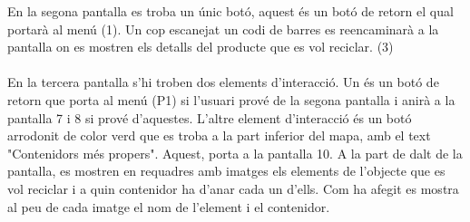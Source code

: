 \documentclass{article}
\begin{document}
En la segona pantalla es troba un únic botó, aquest
és un botó de retorn el qual portarà
al menú (1). Un cop escanejat un codi de barres es reencaminarà
a la pantalla on es mostren els detalls del producte que es vol reciclar. (3)
\\\\
En la tercera pantalla s'hi troben dos elements d'interacció.
Un és un botó de retorn que porta al menú (P1)
si l'usuari prové de la segona pantalla i anirà a
la pantalla 7 i 8 si prové d'aquestes. L'altre
element d'interacció és un botó arrodonit de color
verd que es troba a la part inferior del mapa, amb el text
"Contenidors més propers". Aquest, porta a la pantalla 10.
A la part de dalt de la pantalla, es mostren
en requadres amb imatges els elements de l'objecte
que es vol reciclar i a quin contenidor ha d'anar cada un d'ells.
Com ha afegit es mostra al peu de cada imatge el nom de l'element i el contenidor.
\end{document}
